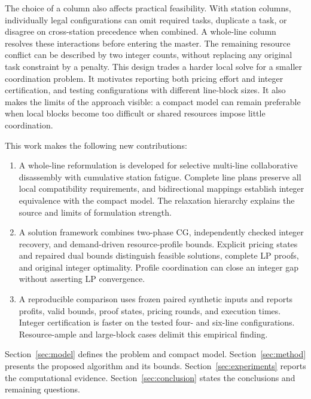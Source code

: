 The choice of a column also affects practical feasibility. With station columns, individually legal configurations can omit required tasks, duplicate a task, or disagree on cross-station precedence when combined. A whole-line column resolves these interactions before entering the master. The remaining resource conflict can be described by two integer counts, without replacing any original task constraint by a penalty. This design trades a harder local solve for a smaller coordination problem. It motivates reporting both pricing effort and integer certification, and testing configurations with different line-block sizes. It also makes the limits of the approach visible: a compact model can remain preferable when local blocks become too difficult or shared resources impose little coordination.

This work makes the following new contributions:
\begin{enumerate}
\item A whole-line reformulation is developed for selective multi-line collaborative disassembly with cumulative station fatigue. Complete line plans preserve all local compatibility requirements, and bidirectional mappings establish integer equivalence with the compact model. The relaxation hierarchy explains the source and limits of formulation strength.
\item A solution framework combines two-phase CG, independently checked integer recovery, and demand-driven resource-profile bounds. Explicit pricing states and repaired dual bounds distinguish feasible solutions, complete LP proofs, and original integer optimality. Profile coordination can close an integer gap without asserting LP convergence.
\item A reproducible comparison uses frozen paired synthetic inputs and reports profits, valid bounds, proof states, pricing rounds, and execution times. Integer certification is faster on the tested four- and six-line configurations. Resource-ample and large-block cases delimit this empirical finding.
\end{enumerate}

Section~\ref{sec:model} defines the problem and compact model. Section~\ref{sec:method} presents the proposed algorithm and its bounds. Section~\ref{sec:experiments} reports the computational evidence. Section~\ref{sec:conclusion} states the conclusions and remaining questions.
